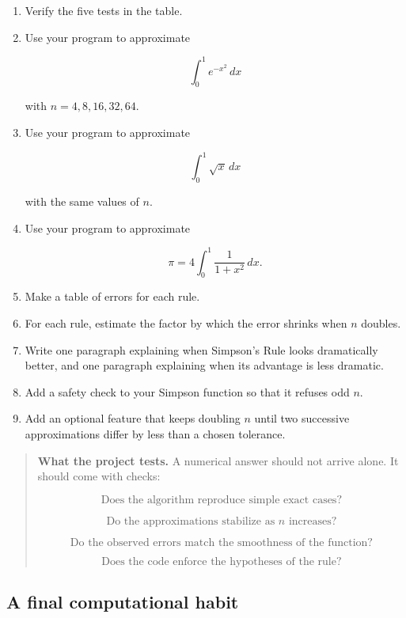 \begin{enumerate}
\item Verify the five tests in the table.

\item Use your program to approximate

\[
\int_0^1 e^{-x^2}\,dx
\]

with \(n=4,8,16,32,64\).

\item Use your program to approximate

\[
\int_0^1 \sqrt{x}\,dx
\]

with the same values of \(n\).

\item Use your program to approximate

\[
\pi=4\int_0^1 \frac{1}{1+x^2}\,dx.
\]

\item Make a table of errors for each rule.

\item For each rule, estimate the factor by which the error shrinks when \(n\) doubles.

\item Write one paragraph explaining when Simpson's Rule looks dramatically better,
and one paragraph explaining when its advantage is less dramatic.

\item Add a safety check to your Simpson function so that it refuses odd \(n\).

\item Add an optional feature that keeps doubling \(n\) until two successive
approximations differ by less than a chosen tolerance.
\end{enumerate}

\begin{quote}
\textbf{What the project tests.}
A numerical answer should not arrive alone.  It should come with checks:

\[
\text{Does the algorithm reproduce simple exact cases?}
\]

\[
\text{Do the approximations stabilize as \(n\) increases?}
\]

\[
\text{Do the observed errors match the smoothness of the function?}
\]

\[
\text{Does the code enforce the hypotheses of the rule?}
\]
\end{quote}

\subsection{A final computational habit}
\label{subsec:final-computational-habit}

